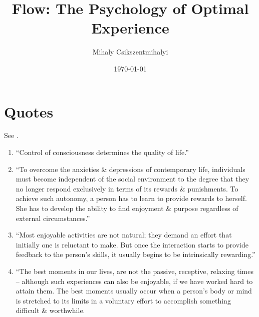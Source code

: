 \documentclass{article}
\title{Flow: The Psychology of Optimal Experience}
\author{Mihaly Csikszentmihalyi}
\date{\today}
\numberwithin{equation}{section}
\begin{document}
\maketitle
\tableofcontents


\section{Quotes}
See \cite{Csikszentmihalyi2008}.
\begin{enumerate}
	\item ``Control of consciousness determines the quality of life.''
	\item ``To overcome the anxieties \& depressions of contemporary life, individuals must become independent of the social environment to the degree that they no longer respond exclusively in terms of its rewards \& punishments. To achieve such autonomy, a person has to learn to provide rewards to herself. She has to develop the ability to find enjoyment \& purpose regardless of external circumstances.''
	\item ``Most enjoyable activities are not natural; they demand an effort that initially one is reluctant to make. But once the interaction starts to provide feedback to the person's skills, it usually begins to be intrinsically rewarding.''
	\item ``The best moments in our lives, are not the passive, receptive, relaxing times -- although such experiences can also be enjoyable, if we have worked hard to attain them. The best moments usually occur when a person's body or mind is stretched to its limits in a voluntary effort to accomplish something difficult \& worthwhile.
	

\end{enumerate}
\end{document}
